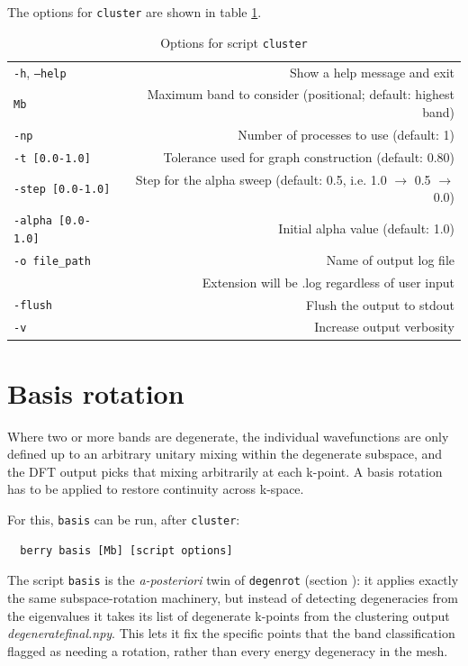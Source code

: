 \documentclass[a4paper,12pt]{report}
\begin{document}
 The options for \texttt{cluster} are shown in table \ref{tab:options_cluster}.

\begin{table}[ht]
  \centering
  \caption{ Options for script \texttt{cluster}}\label{tab:options_cluster}
  \begin{tabular}[]{lr}
  \hline
  \texttt{-h}, \texttt{--help}  & Show a help message and exit \\
  \texttt{Mb}                   & Maximum band to consider (positional; default: highest band) \\
  \texttt{-np}                  & Number of processes to use (default: 1) \\
  \texttt{-t [0.0-1.0]}         & Tolerance used for graph construction (default: 0.80) \\
  \texttt{-step [0.0-1.0]}      & Step for the alpha sweep (default: 0.5, i.e. 1.0 $\to$ 0.5 $\to$ 0.0) \\
  \texttt{-alpha [0.0-1.0]}     & Initial alpha value (default: 1.0) \\
  \texttt{-o file\_path}        & Name of output log file\\
                                & Extension will be .log regardless of user input \\
  \texttt{-flush}               & Flush the output to stdout \\
  \texttt{-v}                   & Increase output verbosity \\
  \hline
 \end{tabular}
 \end{table}



\section{Basis rotation}
 Where two or more bands are degenerate, the individual wavefunctions are only defined up to
 an arbitrary unitary mixing within the degenerate subspace, and the DFT output picks that
 mixing arbitrarily at each k-point. A basis rotation has to be applied to restore continuity
 across k-space.

 For this, \texttt{basis} can be run, after \texttt{cluster}:

 \begin{verbatim}
  berry basis [Mb] [script options]
 \end{verbatim}

 The script \texttt{basis} is the \emph{a-posteriori} twin of \texttt{degenrot}
 (section ): it applies exactly the same subspace-rotation machinery,
 but instead of detecting degeneracies from the eigenvalues it takes its list of degenerate
 k-points from the clustering output \emph{degeneratefinal.npy}. This lets it fix the specific
 points that the band classification flagged as needing a rotation, rather than every energy
 degeneracy in the mesh.
\end{document}
